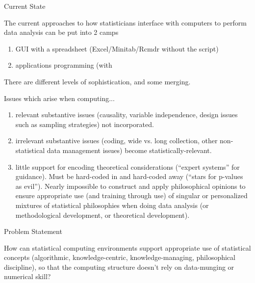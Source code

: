 \documentclass{beamer}
\begin{document}
\begin{frame}{Current State}

  The current approaches to how statisticians interface with computers
  to perform data analysis can be put into 2 camps
  \begin{enumerate}
  \item GUI with a spreadsheet (Excel/Minitab/Rcmdr without the
    script)
  \item applications programming (with
  \end{enumerate}
  There are different levels of sophistication, and some merging.
\end{frame}

\begin{frame}{Issues which arise when computing...}
  \begin{enumerate}
  \item relevant substantive issues (causality, variable independence,
    design issues such as sampling strategies) not incorporated.
  \item irrelevant substantive issues (coding, wide vs. long
    collection, other non-statistical data management issues) become
    statistically-relevant.
  \item little support for encoding theoretical considerations (``expert
    systems'' for guidance).  Must be hard-coded in and hard-coded
    away (``stars for p-values as evil'').   Nearly impossible to
    construct and apply philosophical opinions to ensure appropriate
    use (and training through use) of singular or personalized
    mixtures of statistical philosophies when doing data analysis (or
    methodological development, or theoretical development).
  \end{enumerate}
\end{frame}

\begin{frame}{Problem Statement}

  How can statistical computing environments support appropriate use
  of statistical concepts (algorithmic, knowledge-centric,
  knowledge-managing, philosophical discipline), so that the computing
  structure doesn't rely on data-munging or numerical skill?

\end{frame}
\end{document}
